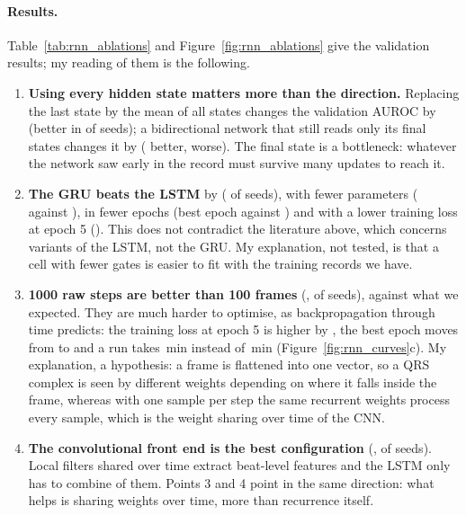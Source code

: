 \paragraph{Results.} Table~\ref{tab:rnn_ablations} and Figure~\ref{fig:rnn_ablations} give the
validation results; my reading of them is the following.
\begin{enumerate}[leftmargin=1.4em,itemsep=2pt]
  \item \textbf{Using every hidden state matters more than the direction.} Replacing the last
        state by the mean of all states changes the validation AUROC by \rnnDiffMeanMean{} (better in
        \rnnNSeedsBetterMean{} of \rnnNSeedsComparedMean{} seeds); a bidirectional network that still
        reads only its final states changes it by \rnnDiffMeanBi{} (\rnnNSeedsBetterBi{} better,
        \rnnNSeedsWorseBi{} worse). The final state is a bottleneck: whatever the network saw early in the
        record must survive many updates to reach it.
  \item \textbf{The GRU beats the LSTM} by \rnnDiffMeanGru{} (\rnnNSeedsBetterGru{} of
        \rnnNSeedsComparedGru{} seeds), with fewer parameters (\rnnParamsGru{} against \rnnParamsBase{}),
        in fewer epochs (best epoch \onedec{\rnnBestEpochMeanGru} against \onedec{\rnnBestEpochMeanBase})
        and with a lower training loss at epoch 5 (\rnnTrainLossEpFiveDiffMeanGru{}). This does not
        contradict the literature above, which concerns variants of the LSTM, not the GRU. My explanation,
        not tested, is that a cell with fewer gates is easier to fit with the
        \edaNLabelledTrain{} training records we have.
  \item \textbf{1000 raw steps are better than 100 frames} (\rnnDiffMeanRaw{}, \rnnNSeedsBetterRaw{} of
        \rnnNSeedsComparedRaw{} seeds), against what we expected. They are much harder to optimise, as
        backpropagation through time predicts: the training loss at epoch 5 is higher by
        \rnnTrainLossEpFiveDiffMeanRaw{}, the best epoch moves from \onedec{\rnnBestEpochMeanBase} to
        \onedec{\rnnBestEpochMeanRaw} and a run takes \onedec{\rnnTrainTimeMinMeanRaw}\,min instead of
        \onedec{\rnnTrainTimeMinMeanBase}\,min (Figure~\ref{fig:rnn_curves}c). My explanation, a
        hypothesis: a frame is flattened into one vector, so a QRS complex is seen by different weights
        depending on where it falls inside the frame, whereas with one sample per step the same recurrent
        weights process every sample, which is the weight sharing over time of the CNN.
  \item \textbf{The convolutional front end is the best configuration} (\rnnDiffMeanConv{},
        \rnnNSeedsBetterConv{} of \rnnNSeedsComparedConv{} seeds). Local filters shared over time extract
        beat-level features and the LSTM only has to combine \rnnStepsConv{} of them. Points 3 and 4 point
        in the same direction: what helps is sharing weights over time, more than recurrence itself.
\end{enumerate}

